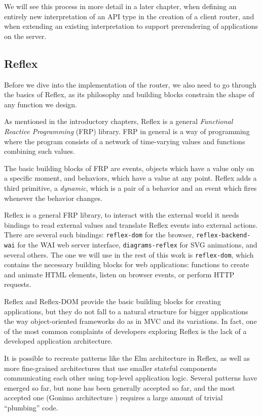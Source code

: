 \documentclass[english,zadani,odsaz]{fitthesis}
\begin{document}
We will see this process in more detail in a later chapter, when defining an
entirely new interpretation of an API type in the creation of a client router,
and when extending an existing interpretation to support prerendering of
applications on the server.

\subsection{Reflex}
\label{sec:orgf1b6cb9}
Before we dive into the implementation of the router, we also need to go through
the basics of Reflex, as its philosophy and building blocks constrain the
shape of any function we design.

As mentioned in the introductory chapters, Reflex is a general \emph{Functional
Reactive Programming} (FRP) library. FRP in general is a way of programming where
the program consists of a network of time-varying values and functions combining
such values.

The basic building blocks of FRP are events, objects which have a value only on
a specific moment, and behaviors, which have a value at any point. Reflex adds a
third primitive, a \emph{dynamic}, which is a pair of a behavior and an event which
fires whenever the behavior changes.

Reflex is a general FRP library, to interact with the external world it needs
bindings to read external values and translate Reflex events into external
actions. There are several such bindings: \texttt{reflex-dom} for the browser,
\texttt{reflex-backend-wai} for the WAI web server interface, \texttt{diagrams-reflex} for SVG
animations, and several others. The one we will use in the rest of this work is
\texttt{reflex-dom}, which contains the necessary building blocks for web applications:
functions to create and animate HTML elements, listen on browser events, or
perform HTTP requests.

Reflex and Reflex-DOM provide the basic building blocks for creating
applications, but they do not fall to a natural structure for bigger applications
the way object-oriented frameworks do as in MVC and its variations. In fact, one
of the most common complaints of developers exploring Reflex is the lack of a
developed application architecture.

It is possible to recreate patterns like the Elm architecture in Reflex, as well
as more fine-grained architectures that use smaller stateful components
communicating each other using top-level application logic. Several patterns
have emerged so far, but none has been generally accepted so far, and the most
accepted one (Gonimo architecture \cite{gonimo}) requires a large amount of
trivial ``plumbing'' code.
\end{document}
